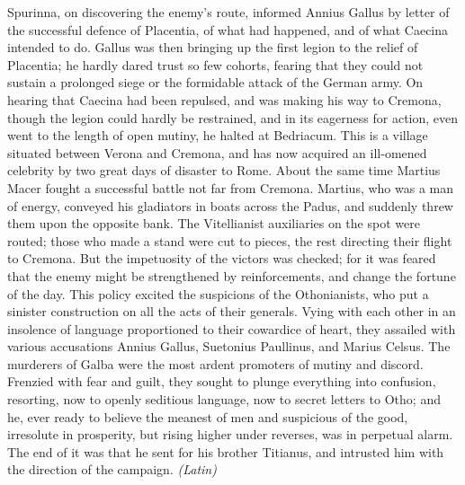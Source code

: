 Spurinna, on discovering the enemy's route, informed Annius Gallus by letter of the successful defence of Placentia, of what had happened, and of what Caecina intended to do. Gallus was then bringing up the first legion to the relief of Placentia; he hardly dared trust so few cohorts, fearing that they could not sustain a prolonged siege or the formidable attack of the German army. On hearing that Caecina had been repulsed, and was making his way to Cremona, though the legion could hardly be restrained, and in its eagerness for action, even went to the length of open mutiny, he halted at Bedriacum. This is a village situated between Verona and Cremona, and has now acquired an ill-omened celebrity by two great days of disaster to Rome. About the same time Martius Macer fought a successful battle not far from Cremona. Martius, who was a man of energy, conveyed his gladiators in boats across the Padus, and suddenly threw them upon the opposite bank. The Vitellianist auxiliaries on the spot were routed; those who made a stand were cut to pieces, the rest directing their flight to Cremona. But the impetuosity of the victors was checked; for it was feared that the enemy might be strengthened by reinforcements, and change the fortune of the day. This policy excited the suspicions of the Othonianists, who put a sinister construction on all the acts of their generals. Vying with each other in an insolence of language proportioned to their cowardice of heart, they assailed with various accusations Annius Gallus, Suetonius Paullinus, and Marius Celsus. The murderers of Galba were the most ardent promoters of mutiny and discord. Frenzied with fear and guilt, they sought to plunge everything into confusion, resorting, now to openly seditious language, now to secret letters to Otho; and he, ever ready to believe the meanest of men and suspicious of the good, irresolute in prosperity, but rising higher under reverses, was in perpetual alarm. The end of it was that he sent for his brother Titianus, and intrusted him with the direction of the campaign. \emph{(Latin)}


